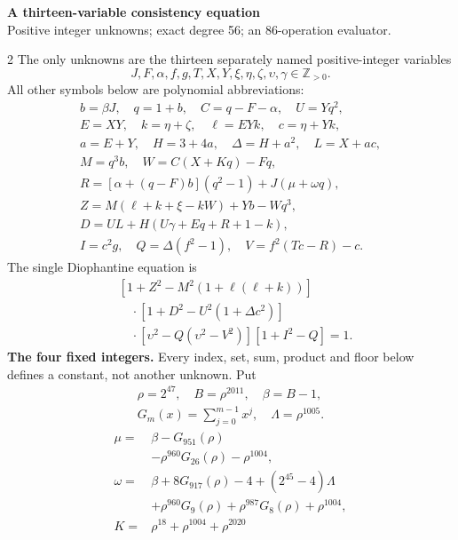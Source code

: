 \documentclass[10pt]{article}
\begin{document}
\begin{center}
{\large\bfseries A thirteen-variable consistency equation}\\[-1pt]
{\small Positive integer unknowns; exact degree 56; an 86-operation evaluator.}
\end{center}\vspace{-8pt}
\begin{multicols}{2}
\fontsize{8.6}{9.1}\selectfont
The only unknowns are the thirteen separately named positive-integer variables
\[
J,F,\alpha,f,g,T,X,Y,\xi,\eta,\zeta,\upsilon,\gamma\in\mathbb Z_{>0}.
\]
All other symbols below are polynomial abbreviations:
\[
\begin{gathered}
b=\beta J,\quad q=1+b,\quad C=q-F-\alpha,\quad U=Yq^2,\\
E=XY,\quad k=\eta+\zeta,\quad \ell=EYk,\quad c=\eta+Yk,\\
a=E+Y,\quad H=3+4a,\quad\Delta=H+a^2,\quad L=X+ac,\\
M=q^3b,\quad W=C(X+Kq)-Fq,\\
R=[\alpha+(q-F)b](q^2-1)+J(\mu+\omega q),\\
Z=M(\ell+k+\xi-kW)+Yb-Wq^3,\\
D=UL+H(U\gamma+Eq+R+1-k),\\
I=c^2g,\quad Q=\Delta(f^2-1),\quad V=f^2(Tc-R)-c.
\end{gathered}
\]
The single Diophantine equation is
\[
\boxed{\begin{aligned}
&[1+Z^2-M^2(1+\ell(\ell+k))]\\
&\quad\cdot[1+D^2-U^2(1+\Delta c^2)]\\
&\quad\cdot[\upsilon^2-Q(\upsilon^2-V^2)]
[1+I^2-Q]=1.
\end{aligned}}
\]
\textbf{The four fixed integers.}
Every index, set, sum, product and floor below defines a constant, not
another unknown. Put
\[
\begin{gathered}
\rho=2^{47},\quad B=\rho^{2011},\quad\beta=B-1,\\
G_m(x)=\sum_{j=0}^{m-1}x^j,\quad
\Lambda=\rho^{1005}.
\end{gathered}
\]
\begin{align*}
\mu={}&\beta-G_{951}(\rho)\\
&-\rho^{960}G_{26}(\rho)-\rho^{1004},\\
\omega={}&\beta+8G_{917}(\rho)-4+(2^{45}-4)\Lambda\\
&+\rho^{960}G_9(\rho)+\rho^{987}G_8(\rho)
  +\rho^{1004},\\
K={}&\rho^{18}+\rho^{1004}+\rho^{2020}\\

\end{align*}
\end{multicols}
\end{document}
